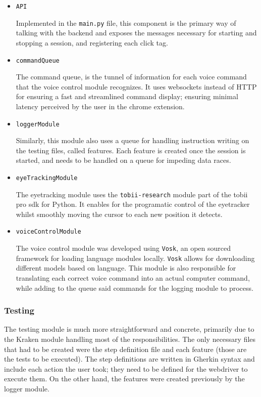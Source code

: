 \begin{itemize}
    \item \verb|API|
    
    Implemented in the \verb|main.py| file, this component is the primary way of talking with the backend and exposes the messages necessary for starting and stopping a session, and registering each click tag. 
    
    \item \verb|commandQueue|
    
    The command queue, is the tunnel of information for each voice command that the voice control module recognizes. It uses websockets instead of HTTP for ensuring a fast and streamlined command display; ensuring minimal latency perceived by the user in the chrome extension. 

    \item \verb|loggerModule|
    
    Similarly, this module also uses a queue for handling instruction writing on the testing files, called features. Each feature is created once the session is started, and needs to be handled on a queue for impeding data races. 
    
    \item \verb|eyeTrackingModule|
    
    The eyetracking module uses the \verb|tobii-research| module part of the tobii pro sdk for Python. It enables for the programatic control of the eyetracker whilst smoothly moving the cursor to each new position it detects. 
    
    \item \verb|voiceControlModule|
    
    The voice control module was developed using \verb|Vosk|, an open sourced framework for loading language modules locally. \verb|Vosk| allows for downloading different models based on language. This module is also responsible for translating each correct voice command into an actual computer command, while adding to the queue said commands for the logging module to process.
    
\end{itemize}

\subsubsection{Testing}

The testing module is much more straightforward and concrete, primarily due to the Kraken module handling most of the responsibilities. The only necessary files that had to be created were the step definition file and each feature (those are the tests to be executed). The step definitions are written in Gherkin syntax and include each action the user took; they need to be defined for the webdriver to execute them. On the other hand, the features were created previously by the logger module.

